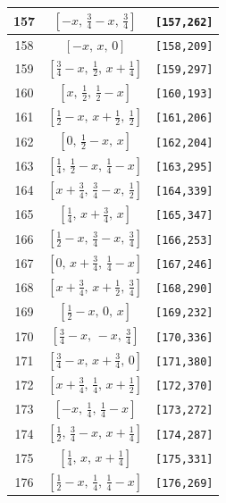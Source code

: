 \documentclass[fleqn,8pt]{jsarticle}
\begin{document}
\begin{longtable}{ccc}
157 & $\left[ - x,\, \frac{3}{4} - x,\, \frac{3}{4} \right]$ & {\tt [157,262]} \\ \hline
158 & $\left[ - x,\, x,\, 0 \right]$ & {\tt [158,209]} \\ \hline
159 & $\left[ \frac{3}{4} - x,\, \frac{1}{2},\, x + \frac{1}{4} \right]$ & {\tt [159,297]} \\ \hline
160 & $\left[ x,\, \frac{1}{2},\, \frac{1}{2} - x \right]$ & {\tt [160,193]} \\ \hline
161 & $\left[ \frac{1}{2} - x,\, x + \frac{1}{2},\, \frac{1}{2} \right]$ & {\tt [161,206]} \\ \hline
162 & $\left[ 0,\, \frac{1}{2} - x,\, x \right]$ & {\tt [162,204]} \\ \hline
163 & $\left[ \frac{1}{4},\, \frac{1}{2} - x,\, \frac{1}{4} - x \right]$ & {\tt [163,295]} \\ \hline
164 & $\left[ x + \frac{3}{4},\, \frac{3}{4} - x,\, \frac{1}{2} \right]$ & {\tt [164,339]} \\ \hline
165 & $\left[ \frac{1}{4},\, x + \frac{3}{4},\, x \right]$ & {\tt [165,347]} \\ \hline
166 & $\left[ \frac{1}{2} - x,\, \frac{3}{4} - x,\, \frac{3}{4} \right]$ & {\tt [166,253]} \\ \hline
167 & $\left[ 0,\, x + \frac{3}{4},\, \frac{1}{4} - x \right]$ & {\tt [167,246]} \\ \hline
168 & $\left[ x + \frac{3}{4},\, x + \frac{1}{2},\, \frac{3}{4} \right]$ & {\tt [168,290]} \\ \hline
169 & $\left[ \frac{1}{2} - x,\, 0,\, x \right]$ & {\tt [169,232]} \\ \hline
170 & $\left[ \frac{3}{4} - x,\, - x,\, \frac{3}{4} \right]$ & {\tt [170,336]} \\ \hline
171 & $\left[ \frac{3}{4} - x,\, x + \frac{3}{4},\, 0 \right]$ & {\tt [171,380]} \\ \hline
172 & $\left[ x + \frac{3}{4},\, \frac{1}{4},\, x + \frac{1}{2} \right]$ & {\tt [172,370]} \\ \hline
173 & $\left[ - x,\, \frac{1}{4},\, \frac{1}{4} - x \right]$ & {\tt [173,272]} \\ \hline
174 & $\left[ \frac{1}{2},\, \frac{3}{4} - x,\, x + \frac{1}{4} \right]$ & {\tt [174,287]} \\ \hline
175 & $\left[ \frac{1}{4},\, x,\, x + \frac{1}{4} \right]$ & {\tt [175,331]} \\ \hline
176 & $\left[ \frac{1}{2} - x,\, \frac{1}{4},\, \frac{1}{4} - x \right]$ & {\tt [176,269]} \\ \hline

\end{longtable}
\end{document}
